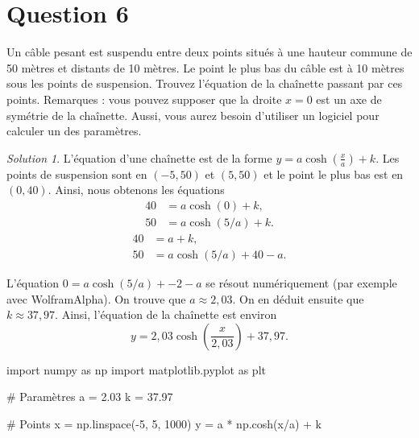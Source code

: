 \documentclass[
  12pt,
  letterpaper,
]{book}
\newenvironment{Shaded}{}{}
\newcommand{\CommentTok}[1]{\textcolor[rgb]{0.42,0.45,0.49}{#1}}
\newcommand{\DecValTok}[1]{\textcolor[rgb]{0.00,0.36,0.77}{#1}}
\newcommand{\FloatTok}[1]{\textcolor[rgb]{0.00,0.36,0.77}{#1}}
\newcommand{\ImportTok}[1]{\textcolor[rgb]{0.01,0.18,0.38}{#1}}
\newcommand{\NormalTok}[1]{\textcolor[rgb]{0.14,0.16,0.18}{#1}}
\newcommand{\OperatorTok}[1]{\textcolor[rgb]{0.14,0.16,0.18}{#1}}
\theoremstyle{remark}
\newtheorem*{solution}{Solution}
\begin{document}
\hypertarget{question-6-3}{%
\section{Question 6}\label{question-6-3}}

Un câble pesant est suspendu entre deux points situés à une hauteur
commune de 50 mètres et distants de 10 mètres. Le point le plus bas du
câble est à 10 mètres sous les points de suspension. Trouvez l'équation
de la chaînette passant par ces points. Remarques : vous pouvez supposer
que la droite \(x=0\) est un axe de symétrie de la chaînette. Aussi,
vous aurez besoin d'utiliser un logiciel pour calculer un des
paramètres.

\begin{solution}

L'équation d'une chaînette est de la forme
\(y = a \cosh(\frac{x}{a}) + k\). Les points de suspension sont en
\((-5,50)\) et \((5,50)\) et le point le plus bas est en \((0,40)\).
Ainsi, nous obtenons les équations \begin{align}
40 &= a \cosh(0) + k,\\
50 &= a \cosh(5/a) + k.
\end{align} \begin{align}
40 &= a + k,\\
50 &= a \cosh(5/a) + 40-a.
\end{align}

L'équation \(0 = a \cosh(5/a) + -2-a\) se résout numériquement (par
exemple avec WolframAlpha). On trouve que \(a \approx 2{,}03\). On en
déduit ensuite que \(k\approx 37{,}97\). Ainsi, l'équation de la
chaînette est environ
\[y = 2{,}03 \cosh\left(\frac{x}{2{,}03}\right) +37{,}97.\]

\begin{Shaded}
\begin{Highlighting}[]
\ImportTok{import}\NormalTok{ numpy }\ImportTok{as}\NormalTok{ np}
\ImportTok{import}\NormalTok{ matplotlib.pyplot }\ImportTok{as}\NormalTok{ plt}

\CommentTok{\# Paramètres}
\NormalTok{a }\OperatorTok{=} \FloatTok{2.03}
\NormalTok{k }\OperatorTok{=} \FloatTok{37.97}

\CommentTok{\# Points}
\NormalTok{x }\OperatorTok{=}\NormalTok{ np.linspace(}\OperatorTok{{-}}\DecValTok{5}\NormalTok{, }\DecValTok{5}\NormalTok{, }\DecValTok{1000}\NormalTok{)}
\NormalTok{y }\OperatorTok{=}\NormalTok{ a }\OperatorTok{*}\NormalTok{ np.cosh(x}\OperatorTok{/}\NormalTok{a) }\OperatorTok{+}\NormalTok{ k}


\end{Highlighting}
\end{Shaded}
\end{solution}
\end{document}
